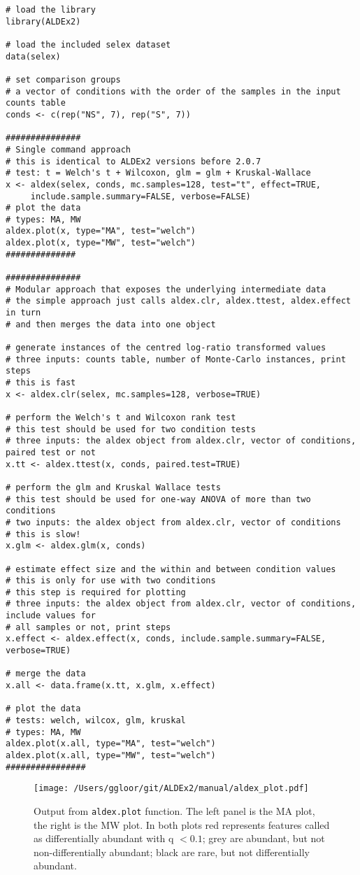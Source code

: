 \documentclass[11pt]{article}
\begin{document}
\begin{verbatim}
# load the library
library(ALDEx2)  

# load the included selex dataset
data(selex)  

# set comparison groups
# a vector of conditions with the order of the samples in the input counts table
conds <- c(rep("NS", 7), rep("S", 7))  

###############
# Single command approach
# this is identical to ALDEx2 versions before 2.0.7
# test: t = Welch's t + Wilcoxon, glm = glm + Kruskal-Wallace
x <- aldex(selex, conds, mc.samples=128, test="t", effect=TRUE, 
     include.sample.summary=FALSE, verbose=FALSE)
# plot the data
# types: MA, MW
aldex.plot(x, type="MA", test="welch")
aldex.plot(x, type="MW", test="welch")
##############

###############
# Modular approach that exposes the underlying intermediate data
# the simple approach just calls aldex.clr, aldex.ttest, aldex.effect in turn
# and then merges the data into one object

# generate instances of the centred log-ratio transformed values
# three inputs: counts table, number of Monte-Carlo instances, print steps
# this is fast
x <- aldex.clr(selex, mc.samples=128, verbose=TRUE)  

# perform the Welch's t and Wilcoxon rank test
# this test should be used for two condition tests
# three inputs: the aldex object from aldex.clr, vector of conditions, paired test or not
x.tt <- aldex.ttest(x, conds, paired.test=TRUE)  

# perform the glm and Kruskal Wallace tests
# this test should be used for one-way ANOVA of more than two conditions 
# two inputs: the aldex object from aldex.clr, vector of conditions
# this is slow!
x.glm <- aldex.glm(x, conds)  

# estimate effect size and the within and between condition values 
# this is only for use with two conditions
# this step is required for plotting
# three inputs: the aldex object from aldex.clr, vector of conditions, include values for 
# all samples or not, print steps
x.effect <- aldex.effect(x, conds, include.sample.summary=FALSE, verbose=TRUE) 

# merge the data
x.all <- data.frame(x.tt, x.glm, x.effect)

# plot the data
# tests: welch, wilcox, glm, kruskal
# types: MA, MW
aldex.plot(x.all, type="MA", test="welch")
aldex.plot(x.all, type="MW", test="welch")
################
\end{verbatim}
\begin{figure}[!h]
\begin{center}
\texttt{[image: /Users/ggloor/git/ALDEx2/manual/aldex\_plot.pdf]}
\caption{Output from \texttt{aldex.plot} function. The left panel is the MA plot, the right is the MW plot. In both plots red represents features called as differentially abundant with q $<0.1$; grey are abundant, but not non-differentially abundant; black are rare, but not differentially abundant.}
\label{selex}\vspace{-0.8cm}
\end{center}
\end{figure}
\end{document}
